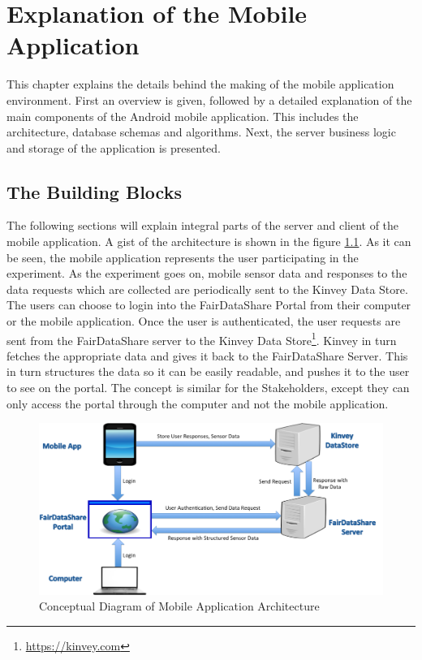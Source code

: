 \chapter{Explanation of the Mobile Application}
This chapter explains the details behind the making of the mobile application environment. First an overview is given, followed by a detailed explanation of the main components of the Android mobile application. This includes the architecture, database schemas and algorithms. Next, the server business logic and storage of the application is presented.

\section{The Building Blocks}

The following sections will explain integral parts of the server and client of the mobile application. A gist of the architecture is shown
in the figure \ref{fig:bb}. As it can be seen, the mobile application represents the user participating in the experiment. As the experiment goes on,
mobile sensor data and responses to the data requests which are collected are periodically sent to the Kinvey Data Store. 
The users can choose to login into the FairDataShare Portal from their computer or the mobile application. Once the user is authenticated, the user requests
are sent from the FairDataShare server to the Kinvey Data Store\footnote{\url{https://kinvey.com}}. Kinvey in turn fetches the appropriate data and gives it back to the FairDataShare Server. This in turn structures the data so it can be easily readable, and pushes it to the user to see on the portal. The concept is similar for the Stakeholders, except they can only access the portal through the computer and not the mobile application.

\begin{figure}[ht!]
\centering
\includegraphics[width=\textwidth,keepaspectratio]{./images/blocks_app}
\caption{Conceptual Diagram of Mobile Application Architecture}
\label{fig:bb}
\end{figure}

